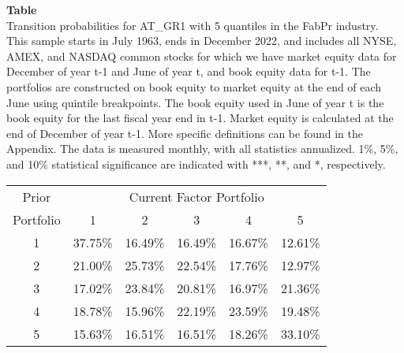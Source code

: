 \begin{table*}[ht!]
\raggedright
{}
\label{tab: transition_probs_AT_GR1_FabPr_with_5_quantiles}
\textbf{Table \thetable} \\
Transition probabilities for AT_GR1 with 5 quantiles in the FabPr industry. \\
\hspace*{1em}This sample starts in July 1963, ends in December 2022, and includes all NYSE, AMEX, and NASDAQ common stocks for which we have market equity data for December of year t-1 and June of year t, and book equity data for t-1. The portfolios are constructed on book equity to market equity at the end of each June using quintile breakpoints.  The book equity used in June of year t is the book equity for the last fiscal year end in t-1.  Market equity is calculated at the end of December of year t-1.  More specific definitions can be found in the Appendix.  The data is measured monthly, with all statistics annualized.  1\%, 5\%, and 10\% statistical significance are indicated with ***, **, and *, respectively. \\
\vspace{0.5em}
\centering
\begin{adjustbox}{max width=\textwidth}
\begin{tabular}{@{}cccccc@{}}
\toprule
Prior & \multicolumn{5}{c}{Current Factor Portfolio} \\
Portfolio & 1 & 2 & 3 & 4 & 5 \\
\midrule
1 & 37.75\% & 16.49\% & 16.49\% & 16.67\% & 12.61\% \\
2 & 21.00\% & 25.73\% & 22.54\% & 17.76\% & 12.97\% \\
3 & 17.02\% & 23.84\% & 20.81\% & 16.97\% & 21.36\% \\
4 & 18.78\% & 15.96\% & 22.19\% & 23.59\% & 19.48\% \\
5 & 15.63\% & 16.51\% & 16.51\% & 18.26\% & 33.10\% \\
\bottomrule
\end{tabular}
\end{adjustbox}
\end{table*}